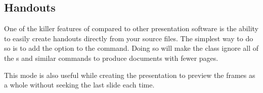 \subsection{Handouts}

One of the killer features of  compared to other presentation
software is the ability to easily create handouts directly from your source
files. The simplest way to do so is to add the option  to the
 command. Doing so will make the  class ignore
all of the s and similar commands to produce documents with fewer
pages.
This mode is also useful while creating the presentation to preview the frames
as a whole without seeking the last slide each time.

